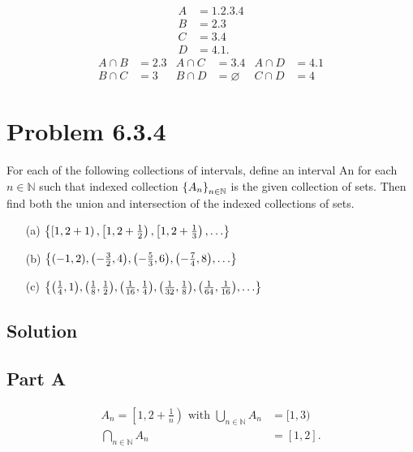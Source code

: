 \documentclass[12pt]{extarticle}
\begin{document}
\begin{align*}
	A &= \qty{1,2,3,4} \\
	B &= \qty{2,3} \\
	C &= \qty{3,4} \\
	D &= \qty{4,1}
.\end{align*}
\begin{align*}
	A \cap B &= \qty{2,3} & A \cap C &= \qty{3,4} & A \cap D &= \qty{4,1} \\
	B \cap C &= \qty{3} & B \cap D &= \varnothing & C \cap D &= \qty{4}
\end{align*}

\section*{Problem 6.3.4}

For each of the following collections of intervals, define an interval An for each $n \in \mathbb{N}$ such that indexed collection $\qty{A_n}_{n \in \mathbb{N}}$ is the given collection of sets. Then find both the union and intersection of the indexed collections of sets.

\begin{enumerate}
	\item[(a)] $\qty{\left[1, 2+1\right), \left[1, 2 + \frac{1}{2}\right), \left[1, 2+ \frac{1}{3}\right), \ldots}$
	\item[(b)] $\qty{
			\qty(-1,2), \qty(-\frac{3}{2},4),\qty(-\frac{5}{3}, 6), \qty(-\frac{7}{4}, 8), \ldots
		}$
	\item[(c)] $\qty{
			\qty(\frac{1}{4},1), \qty(\frac{1}{8},\frac{1}{2}), \qty(\frac{1}{16},\frac{1}{4}), \qty(\frac{1}{32},\frac{1}{8}), \qty(\frac{1}{64},\frac{1}{16}), \ldots
		}$
\end{enumerate}

\subsection*{Solution}
\subsection*{Part A}

\begin{align*}
	A_n = \left[ 1, 2 + \frac{1}{n} \right) \text{ with } \bigcup\limits_{n \in \mathbb{N}} A_n &= [1,3) \\
	\bigcap\limits_{n \in \mathbb{N}} A_n &= [1,2]
.\end{align*}
\end{document}
